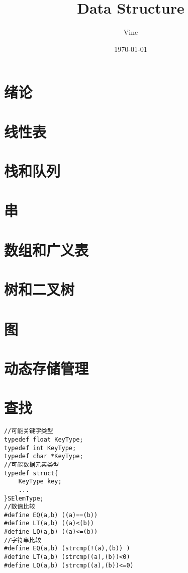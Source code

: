 \documentclass[UTF8]{ctexart}
\title{Data Structure}
\author{Vine}
\date{\today}
\begin{document}
    

\setlength{\headheight}{15pt}
\maketitle %
\newpage
\tableofcontents{}

\newpage
\section{绪论}
\newpage
\section{线性表}
\newpage
\section{栈和队列}
\newpage
\section{串}
\newpage
\section{数组和广义表}
\newpage
\section{树和二叉树}
\newpage
\section{图}
\newpage
\section{动态存储管理}




\newpage
\section{查找}
\begin{lstlisting}[style=v1]
//可能关键字类型
typedef float KeyType;
typedef int KeyType;
typedef char *KeyType;
//可能数据元素类型
typedef struct{
    KeyType key;
    ...
}SElemType;
//数值比较
#define EQ(a,b) ((a)==(b))
#define LT(a,b) ((a)<(b))
#define LQ(a,b) ((a)<=(b))
//字符串比较
#define EQ(a,b) (strcmp(!(a),(b)) )
#define LT(a,b) (strcmp((a),(b))<0)
#define LQ(a,b) (strcmp((a),(b))<=0)

\end{lstlisting}
\end{document}
